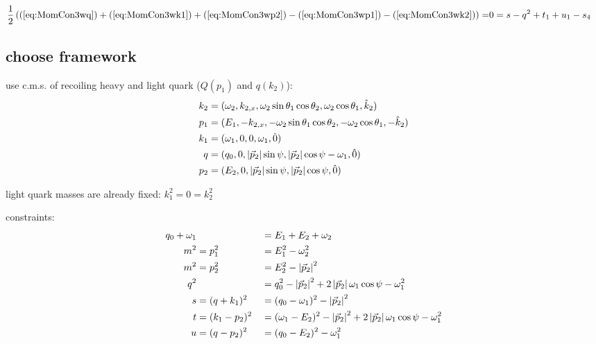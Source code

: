 \documentclass[
  ngerman,		%
  a4paper,		%
  11pt,			%
  DIV=12,		%
  parskip=half  	%
]{scrartcl}
\begin{document}
\begin{align}
\frac 1 2 \left((\ref{eq:MomCon3wq}) + (\ref{eq:MomCon3wk1}) + (\ref{eq:MomCon3wp2}) - (\ref{eq:MomCon3wp1}) - (\ref{eq:MomCon3wk2})\right)=&0= s - q^2 + t_1 + u_1 - s_4
\end{align}

\subsection{choose framework}
use c.m.s. of recoiling heavy and light quark ($Q(p_1)$ and $q(k_2)$):
\begin{align}
k_2 &= (\omega_2,k_{2,x},\omega_2\sin\theta_1\cos\theta_2,\omega_2\cos\theta_1, \hat k_2)\\
p_1 &= (E_1,-k_{2,x},-\omega_2\sin\theta_1\cos\theta_2,-\omega_2\cos\theta_1, -\hat k_2)\\
k_1 &= (\omega_1,0,0,\omega_1, \hat 0)\\
q &= (q_0,0,\left|\vec p_2\right|\sin\psi,\left|\vec p_2\right|\cos\psi-\omega_1, \hat 0)\\
p_2 &= (E_2,0,\left|\vec p_2\right|\sin\psi,\left|\vec p_2\right|\cos\psi, \hat 0)
\end{align}

light quark masses are already fixed: $k_1^2 = 0 = k_2^2$

constraints:
\begin{align}
q_0+\omega_1 & &&=E_1+E_2+\omega_2 \label{eq:PSConMomCon}\\
m^2 &= p_1^2 &&= E_1^2 - \omega_2^2 \label{eq:PSConp1}\\
m^2 &= p_2^2 &&= E_2^2 - \left|\vec p_2\right|^2 \label{eq:PSConp2} \\
q^2 & &&= q_0^2 - \left|\vec p_2\right|^2 + 2\left|\vec p_2\right|\omega_1\cos\psi-\omega_1^2 \label{eq:PSConq}\\
s &= (q+k_1)^2 &&= (q_0-\omega_1)^2 - \left|\vec p_2\right|^2 \label{eq:PSCons}\\
t &= (k_1-p_2)^2 &&= (\omega_1-E_2)^2-\left|\vec p_2\right|^2+2\left|\vec p_2\right|\omega_1\cos\psi-\omega_1^2 \label{eq:PSCont}\\
u &= (q-p_2)^2 &&= (q_0-E_2)^2 - \omega_1^2 \label{eq:PSConu}
\end{align}
\end{document}

